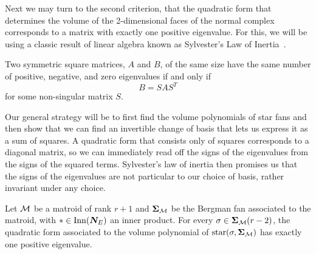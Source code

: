 \documentclass[12pt,oneside]{../../sfsuthesis}
\begin{document}
Next we may turn to the second criterion, that the quadratic form that determines the volume of the 2-dimensional faces of the normal complex corresponds to a matrix with exactly one positive eigenvalue.
For this, we will be using a classic result of linear algebra known as Sylvester's Law of Inertia~\cite{sylvesterXIXDemonstrationTheorem1852}.
\begin{proposition}\th\label{thm:sylvester}
    Two symmetric square matrices, \( A \) and \( B \), of the same size have the same number of positive, negative, and zero eigenvalues if and only if
    \[
        B = SAS^{T}
    \]
    for some non-singular matrix \( S \).
\end{proposition}
Our general strategy will be to first find the volume polynomials of star fans and then show that we can find an invertible change of basis that lets us express it as a sum of squares.
A quadratic form that consists only of squares corresponds to a diagonal matrix, so we can immediately read off the signs of the eigenvalues from the signs of the squared terms.
Sylvester's law of inertia then promises us that the signs of the eigenvalues are not particular to our choice of basis, rather invariant under any choice.
\begin{lemma}\th\label{thm:matroidOnePosEigen}

    Let \( \mathcal{M} \) be a matroid of rank \( r + 1 \) and \( {\bm{\Sigma}}_{\mathcal{M}} \) be the Bergman fan associated to the matroid, with \( \ast \in \mathrm{Inn}(\bm{N}_E) \) an inner product.
    For every \( \sigma \in {\bm{\Sigma}}_{\mathcal{M}}(r - 2) \), the quadratic form associated to the volume polynomial of \( \operatorname{star}(\sigma, {\bm{\Sigma}}_{\mathcal{M}}) \) has exactly one positive eigenvalue.

\end{lemma}
\end{document}
